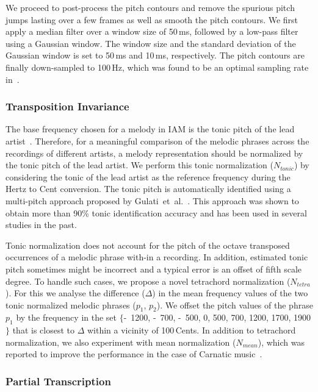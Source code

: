 We proceed to post-process the pitch contours and remove the spurious pitch jumps lasting over a few frames as well as smooth the pitch contours. We first apply a median filter over a window size of 50\,ms, followed by a low-pass filter using a Gaussian window. The window size and the standard deviation of the Gaussian window is set to 50\,ms and 10\,ms, respectively. The pitch contours are finally down-sampled to 100\,Hz, which was found to be an optimal sampling rate in~\cite{gulati_ICASSP2015}. 

\subsubsection{Transposition Invariance}
\label{sec:patterns_improving_similarity_transposition_invariance}

The base frequency chosen for a melody in IAM is the tonic pitch of the lead artist~\cite{Gulati2014Tonic}. Therefore, for a meaningful comparison of the melodic phrases across the recordings of different artists, a melody representation should be normalized by the tonic pitch of the lead artist. We perform this tonic normalization ($N_{tonic}$) by considering the tonic of the lead artist as the reference frequency during the Hertz to Cent conversion. The tonic pitch is automatically identified using a multi-pitch approach proposed by Gulati~et~al.~\cite{Gulati2014Tonic}. This approach was shown to obtain more than 90\% tonic identification accuracy and has been used in several studies in the past.


Tonic normalization does not account for the pitch of the octave transposed occurrences of a melodic phrase with-in a recording. In addition, estimated tonic pitch sometimes might be incorrect and a typical error is an offset of fifth scale degree.  To handle such cases, we propose a novel tetrachord normalization ($N_{tetra}$). For this we analyse the difference ($\Delta$) in the mean frequency values of the two tonic normalized melodic phrases ($p_1$, $p_2$). We offset the pitch values of the phrase $p_1$ by the frequency in the set $\lbrace$-~1200, -~700, -~500, 0, 500, 700, 1200, 1700, 1900$\rbrace$ that is closest to $\Delta$ within a vicinity of 100\,Cents. In addition to tetrachord normalization, we also experiment with mean normalization ($N_{mean}$), which was reported to improve the performance in the case of Carnatic music~\cite{gulati_ICASSP2015}. 

\subsubsection{Partial Transcription}
\label{sec:patterns_improving_similarity_partial_transcription}

